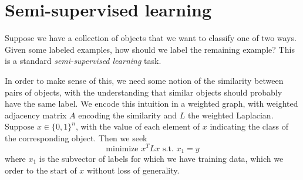 \documentclass[12pt, leqno]{article} %
\begin{document}


\section{Semi-supervised learning}

Suppose we have a collection of objects that we want to classify
one of two ways.  Given some labeled examples, how should we label
the remaining example?  This is a standard
{\em semi-supervised learning} task.

In order to make sense of this, we need some notion of the similarity
between pairs of objects, with the understanding that similar objects
should probably have the same label.  We encode this intuition in a
weighted graph, with weighted adjacency matrix $A$ encoding the
similarity and $L$ the weighted Laplacian.  Suppose $x \in \{0,1\}^n$,
with the value of each element of $x$ indicating the class of the
corresponding object.  Then we seek
\[
  \mbox{minimize } x^T L x \mbox{ s.t.~} x_1 = y
\]
where $x_1$ is the subvector of labels for which we have training
data, which we order to the start of $x$ without loss of generality.
\end{document}

